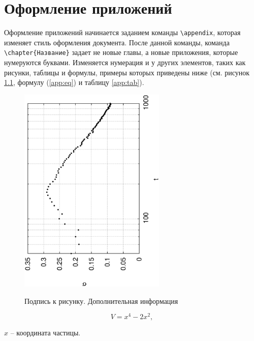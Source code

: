 \chapter{Оформление приложений}
\label{app:1}

Оформление приложений начинается заданием команды \verb|\appendix|, которая изменяет стиль оформления документа. После данной команды, команда \verb|\chapter{Название}| задает не новые главы, а новые приложения, которые нумеруются буквами. Изменяется нумерация и у других элементов, таких как рисунки, таблицы и формулы, примеры которых приведены ниже (см. рисунок \ref{app:fig}, формулу (\ref{app:eq}) и таблицу \ref{app:tab}).

\begin{figure}[ht!]
\begin{center}
\includegraphics[angle=270,width=7cm]{test}\\
\caption{Подпись к рисунку. Дополнительная информация}
\label{app:fig}
\end{center}
\end{figure}

\begin{equation}\label{app:eq}
V = x^4 - 2 x^2,
\end{equation}
\begin{eqrem}
$x$ -- координата частицы.
\end{eqrem}

